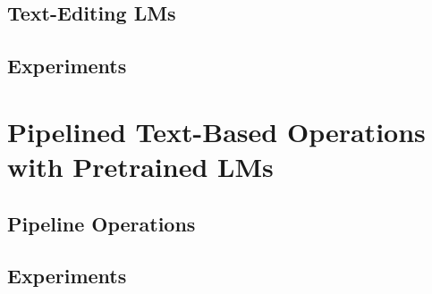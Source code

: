 \subsection{Text-Editing LMs}
\label{sec:text-editing}
\subsection{Experiments}
\label{sec:text-editing-exp}
\section{Pipelined Text-Based Operations with Pretrained LMs}
\label{sec:pipeline}
\subsection{Pipeline Operations}
\label{sec:pipeline-ops}
\subsection{Experiments}
\label{sec:pipeline-exp}
